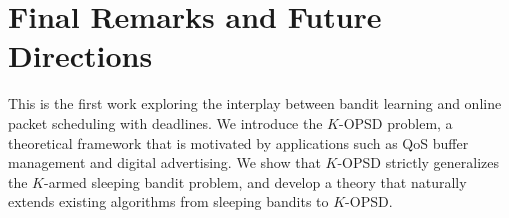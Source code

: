\section{Final Remarks and Future Directions}
This is the first work exploring the interplay between bandit learning and online packet scheduling with deadlines. We introduce the $K$-OPSD problem, a theoretical framework that is motivated by applications such as QoS buffer management and digital advertising. We show that $K$-OPSD strictly generalizes the $K$-armed sleeping bandit problem, and develop a theory that naturally extends existing algorithms from sleeping bandits to $K$-OPSD.



